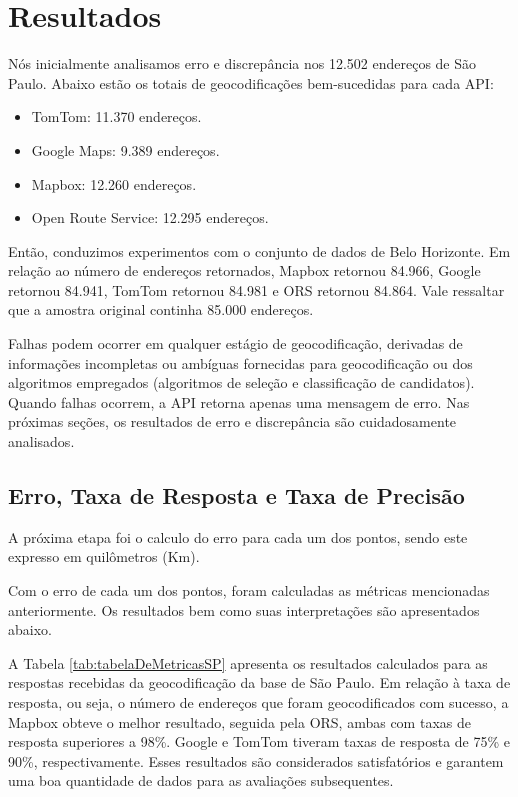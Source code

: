 \chapter{Resultados} \label{resultado}

Nós inicialmente analisamos erro e discrepância nos 12.502 endereços de São Paulo. Abaixo estão os totais de geocodificações bem-sucedidas para cada API:

\begin{itemize}
    \item TomTom: 11.370 endereços.
    \item Google Maps: 9.389 endereços.
    \item Mapbox: 12.260 endereços.
    \item Open Route Service: 12.295 endereços.
\end{itemize}

Então, conduzimos experimentos com o conjunto de dados de Belo Horizonte. Em relação ao número de endereços retornados, Mapbox retornou 84.966, Google retornou 84.941, TomTom retornou 84.981 e ORS retornou 84.864. Vale ressaltar que a amostra original continha 85.000 endereços.

Falhas podem ocorrer em qualquer estágio de geocodificação, derivadas de informações incompletas ou ambíguas fornecidas para geocodificação ou dos algoritmos empregados (algoritmos de seleção e classificação de candidatos). Quando falhas ocorrem, a API retorna apenas uma mensagem de erro. Nas próximas seções, os resultados de erro e discrepância são cuidadosamente analisados.

\section{Erro, Taxa de Resposta e Taxa de Precisão}

A próxima etapa foi o calculo do erro para cada um dos pontos, sendo este expresso em quilômetros (Km).

Com o erro de cada um dos pontos, foram calculadas as métricas mencionadas anteriormente. Os resultados bem como suas interpretações são apresentados abaixo.

A Tabela \ref{tab:tabelaDeMetricasSP} apresenta os resultados calculados para as respostas recebidas da geocodificação da base de São Paulo. Em relação à taxa de resposta, ou seja, o número de endereços que foram geocodificados com sucesso, a Mapbox obteve o melhor resultado, seguida pela ORS, ambas com taxas de resposta superiores a 98\%. Google e TomTom tiveram taxas de resposta de 75\% e 90\%, respectivamente. Esses resultados são considerados satisfatórios e garantem uma boa quantidade de dados para as avaliações subsequentes.

